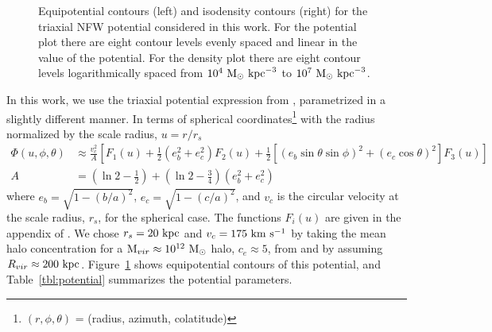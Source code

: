 \documentclass[letterpaper,12pt,preprint]{aastex}
\newcommand{\msun}{\ensuremath{\mathrm{M}_\odot}}
\begin{document}
\begin{figure}[h]
\centering
\caption{Equipotential contours (left) and isodensity contours (right) for the triaxial NFW potential considered in this work. For the potential plot there are eight contour levels evenly spaced and linear in the value of the potential. For the density plot there are eight contour levels logarithmically spaced from $10^4~\msun~{\rm kpc}^{-3}$ to $10^7~\msun~{\rm kpc}^{-3}$.}
\label{fig:potential}
\end{figure}

In this work, we use the triaxial potential expression from \citet{leesuto03}, parametrized in a slightly different manner. In terms of spherical coordinates\footnote{$(r,\phi,\theta)$ = (radius, azimuth, colatitude)} with the radius normalized by the scale radius, $u = r/r_s$
\begin{align}
	\Phi(u,\phi,\theta) &\approx \frac{v_c^2}{A}\left[F_1(u) + \frac{1}{2}(e_b^2 + e_c^2)F_2(u) + \frac{1}{2} [(e_b\sin\theta \sin\phi)^2 + (e_c\cos\theta)^2] F_3(u) \right]\label{eq:potential}\\
	A &= \left(\ln2 - \frac{1}{2}\right) + \left(\ln2-\frac{3}{4}\right) (e_b^2 + e_c^2)
\end{align}
where $e_b = \sqrt{1 - (b/a)^2}$, $e_c = \sqrt{1 - (c/a)^2}$, and $v_c$ is the circular velocity at the scale radius, $r_s$, for the spherical case. The functions $F_i(u)$ are given in the appendix of \cite{leesuto03}. We chose $r_s=20~{\rm kpc}$ and $v_c = 175~{\rm km}~{\rm s}^{-1}$ by taking the mean halo concentration for a ${\rm M}_{vir} \approx 10^{12}~\msun$ halo, $c_e\approx5$, from \cite{jing02} and by assuming $R_{vir}\approx200~{\rm kpc}$. Figure~\ref{fig:potential} shows equipotential contours of this potential, and Table~\ref{tbl:potential} summarizes the potential parameters.
\end{document}
